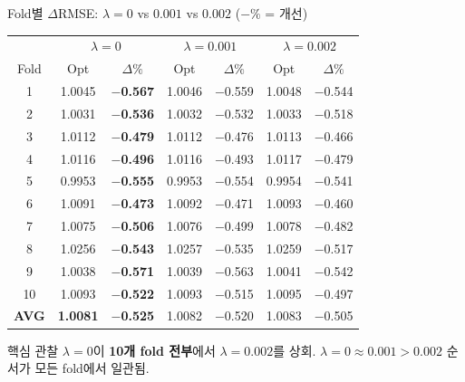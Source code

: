 \documentclass[aspectratio=169,10pt]{beamer}
\begin{document}
\begin{frame}[shrink=5]{Fold별 $\Delta$RMSE: $\lambda=0$ vs $0.001$ vs $0.002$ \textnormal{\small($-\%$ = 개선)}}
	\begin{center}
	\renewcommand{\arraystretch}{1.25}
	\begin{tabular}{c|cc|cc|cc}
		\toprule
		& \multicolumn{2}{c|}{$\lambda=0$} & \multicolumn{2}{c|}{$\lambda=0.001$} & \multicolumn{2}{c}{$\lambda=0.002$} \\
		Fold & Opt & $\Delta\%$ & Opt & $\Delta\%$ & Opt & $\Delta\%$ \\
		\midrule
		1  & 1.0045 & \textbf{$-$0.567} & 1.0046 & $-$0.559 & 1.0048 & $-$0.544 \\
		2  & 1.0031 & \textbf{$-$0.536} & 1.0032 & $-$0.532 & 1.0033 & $-$0.518 \\
		3  & 1.0112 & \textbf{$-$0.479} & 1.0112 & $-$0.476 & 1.0113 & $-$0.466 \\
		4  & 1.0116 & \textbf{$-$0.496} & 1.0116 & $-$0.493 & 1.0117 & $-$0.479 \\
		5  & 0.9953 & \textbf{$-$0.555} & 0.9953 & $-$0.554 & 0.9954 & $-$0.541 \\
		6  & 1.0091 & \textbf{$-$0.473} & 1.0092 & $-$0.471 & 1.0093 & $-$0.460 \\
		7  & 1.0075 & \textbf{$-$0.506} & 1.0076 & $-$0.499 & 1.0078 & $-$0.482 \\
		8  & 1.0256 & \textbf{$-$0.543} & 1.0257 & $-$0.535 & 1.0259 & $-$0.517 \\
		9  & 1.0038 & \textbf{$-$0.571} & 1.0039 & $-$0.563 & 1.0041 & $-$0.542 \\
		10 & 1.0093 & \textbf{$-$0.522} & 1.0093 & $-$0.515 & 1.0095 & $-$0.497 \\
		\midrule
		\textbf{AVG} & \textbf{1.0081} & \textbf{$-$0.525} & 1.0082 & $-$0.520 & 1.0083 & $-$0.505 \\
		\bottomrule
	\end{tabular}
	\end{center}

	\vspace{0.3em}
	\begin{block}{핵심 관찰}
		$\lambda=0$이 \textbf{10개 fold 전부}에서 $\lambda=0.002$를 상회.
		$\lambda=0 \approx 0.001 > 0.002$ 순서가 모든 fold에서 일관됨.
	\end{block}
\end{frame}
\end{document}
